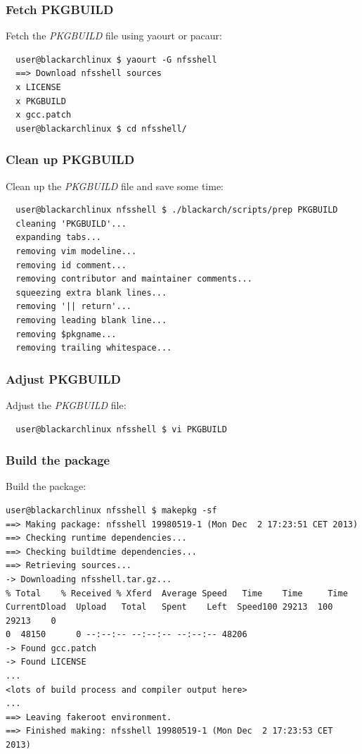\documentclass[a4paper, oneside, 11pt]{book}
\begin{document}
\subsubsection{Fetch PKGBUILD}
Fetch the \textit{PKGBUILD} file using yaourt or pacaur:
\begin{lstlisting}
  user@blackarchlinux $ yaourt -G nfsshell
  ==> Download nfsshell sources
  x LICENSE
  x PKGBUILD
  x gcc.patch
  user@blackarchlinux $ cd nfsshell/
\end{lstlisting}

\subsubsection{Clean up PKGBUILD}
Clean up the \textit{PKGBUILD} file and save some time:
\begin{lstlisting}
  user@blackarchlinux nfsshell $ ./blackarch/scripts/prep PKGBUILD
  cleaning 'PKGBUILD'...
  expanding tabs...
  removing vim modeline...
  removing id comment...
  removing contributor and maintainer comments...
  squeezing extra blank lines...
  removing '|| return'...
  removing leading blank line...
  removing $pkgname...
  removing trailing whitespace...
\end{lstlisting}

\subsubsection{Adjust PKGBUILD}
Adjust the \textit{PKGBUILD} file:
\begin{lstlisting}
  user@blackarchlinux nfsshell $ vi PKGBUILD
\end{lstlisting}

\subsubsection{Build the package}
Build the package:
\begin{lstlisting}user@blackarchlinux nfsshell $ makepkg -sf
==> Making package: nfsshell 19980519-1 (Mon Dec  2 17:23:51 CET 2013)
==> Checking runtime dependencies...
==> Checking buildtime dependencies...
==> Retrieving sources...
-> Downloading nfsshell.tar.gz...
% Total    % Received % Xferd  Average Speed   Time    Time     Time
CurrentDload  Upload   Total   Spent    Left  Speed100 29213  100 29213    0
0  48150      0 --:--:-- --:--:-- --:--:-- 48206
-> Found gcc.patch
-> Found LICENSE
...
<lots of build process and compiler output here>
...
==> Leaving fakeroot environment.
==> Finished making: nfsshell 19980519-1 (Mon Dec  2 17:23:53 CET 2013)
\end{lstlisting}
\end{document}

